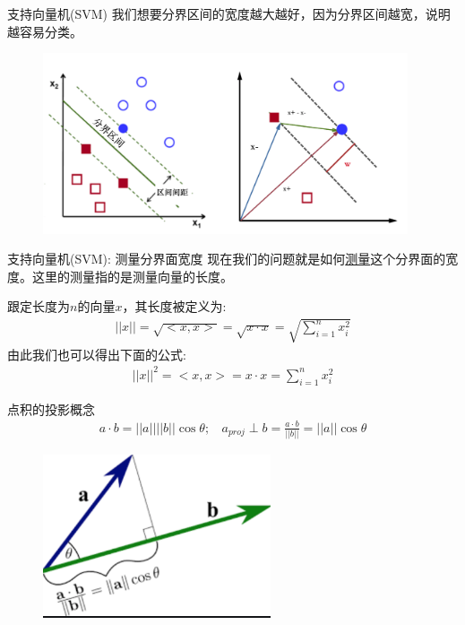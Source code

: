 \documentclass[handout]{ctexbeamer}
\begin{document}
\begin{frame}{支持向量机(SVM)}
我们想要分界区间的宽度越大越好，因为分界区间越宽，说明越容易分类。
\begin{figure}[H]
	\centering
	\includegraphics[width=0.96\textwidth]{fig/C2C2svm3}
\end{figure}	
\end{frame}

\begin{frame}{支持向量机(SVM): 测量分界面宽度}
现在我们的问题就是如何\underline{测量}这个分界面的宽度。这里的测量指的是测量向量的长度。
\begin{definition}
	跟定长度为$n$的向量$x$，其长度被定义为:
	\begin{align*}
		||x|| = \sqrt{<x, x>} = \sqrt{x \cdot x} = \sqrt{\sum_{i=1}^n x_i^2}
	\end{align*}
	由此我们也可以得出下面的公式:
	\begin{align*}
		||x||^2 = <x, x > = x \cdot x = \sum_{i=1}^n x_i^2
	\end{align*}
\end{definition}
\end{frame}

\begin{frame}{点积的投影概念}
	\begin{align*}
	a \cdot b= ||a|| ||b|| \cos \theta; \ \ \ \ a_{proj} \perp b = \frac{a \cdot b}{||b||} = ||a || \cos \theta
\end{align*}
\begin{figure}[H]
	\centering
	\includegraphics[width=0.6\textwidth]{fig/C2C2svmprojc}
\end{figure}
\end{frame}
\end{document}
